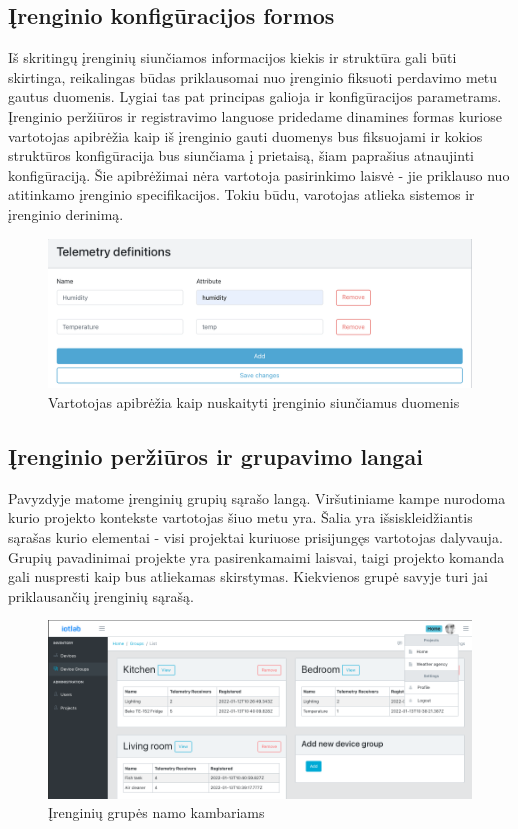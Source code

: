 \documentclass{VUMIFInfBakalaurinis}
\begin{document}
\subsection{Įrenginio konfigūracijos formos}
Iš skritingų įrenginių siunčiamos informacijos kiekis ir struktūra gali būti skirtinga, reikalingas būdas priklausomai nuo įrenginio fiksuoti perdavimo metu gautus duomenis.
Lygiai tas pat principas galioja ir konfigūracijos parametrams.
Įrenginio peržiūros ir registravimo languose pridedame dinamines formas kuriose vartotojas apibrėžia kaip iš įrenginio gauti duomenys bus fiksuojami ir kokios struktūros konfigūracija bus siunčiama į prietaisą, šiam paprašius atnaujinti konfigūraciją.
Šie apibrėžimai nėra vartotoja pasirinkimo laisvė - jie priklauso nuo atitinkamo įrenginio specifikacijos. Tokiu būdu, varotojas atlieka sistemos ir įrenginio derinimą.
\begin{figure}[H]
    \centering
    \includegraphics[scale=0.5]{img/telemetry-form}
    \caption{Vartotojas apibrėžia kaip nuskaityti įrenginio siunčiamus duomenis}
    \label{img:mlp}
\end{figure}

\subsection{Įrenginio peržiūros ir grupavimo langai}

Pavyzdyje matome įrenginių grupių sąrašo langą. Viršutiniame kampe nurodoma kurio projekto kontekste vartotojas šiuo metu yra.
Šalia yra išsiskleidžiantis sąrašas kurio elementai - visi projektai kuriuose prisijungęs vartotojas dalyvauja.
Grupių pavadinimai projekte yra pasirenkamaimi laisvai, taigi projekto komanda gali nuspresti kaip bus atliekamas skirstymas.
Kiekvienos grupė savyje turi jai priklausančių įrenginių sąrašą.

\begin{figure}[H]
    \centering
    \includegraphics[scale=0.5]{img/device-groups-results}
    \caption{Įrenginių grupės namo kambariams}   %
    \label{img:mlp}
\end{figure}
\end{document}
